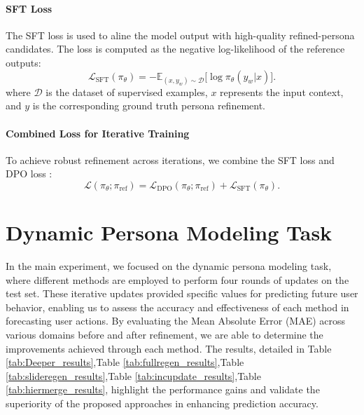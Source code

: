 \paragraph{SFT Loss}
The SFT loss is used to aline the model output with high-quality refined-persona candidates. The loss is computed as the negative log-likelihood of the reference outputs:
\[
\mathcal{L}_{\text{SFT}}(\pi_\theta) = - \mathbb{E}_{(x, y_w) \sim \mathcal{D}} \big[ \log \pi_\theta(y_w|x) \big]. \tag{12}
\]
where \(\mathcal{D}\) is the dataset of supervised examples, \(x\) represents the input context, and \(y\) is the corresponding ground truth persona refinement.


\paragraph{Combined Loss for Iterative Training}
To achieve robust refinement across iterations, we combine the SFT loss and DPO loss :
\[
\mathcal{L}(\pi_\theta; \pi_{\text{ref}}) = \mathcal{L}_{\text{DPO}}(\pi_\theta; \pi_{\text{ref}}) +  \mathcal{L}_{\text{SFT}}(\pi_\theta). \tag{13}
\]








\clearpage
\section{Dynamic Persona Modeling Task}


In the main experiment, we focused on the dynamic persona modeling task, where different methods are employed to perform four rounds of updates on the test set. These iterative updates provided specific values for predicting future user behavior, enabling us to assess the accuracy and effectiveness of each method in forecasting user actions. By evaluating the Mean Absolute Error (MAE) across various domains before and after refinement, we are able to determine the improvements achieved through each method. The results, detailed in Table \ref{tab:Deeper_results},Table \ref{tab:fullregen_results},Table \ref{tab:slideregen_results},Table \ref{tab:incupdate_results},Table \ref{tab:hiermerge_results}, highlight the performance gains and validate the superiority of the proposed approaches in enhancing prediction accuracy.



